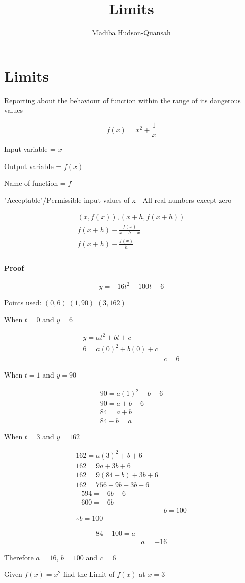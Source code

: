 \documentclass[12pt letter]{article}
\title{Limits}
\author{Madiba Hudson-Quansah}
\begin{document}
\part{Limits}
Reporting about the behaviour of function within the range of its dangerous values

\begin{displaymath}
	f(x) = x^2 + \frac{1}{x}
\end{displaymath}

Input variable = $x$

Output variable = $f(x)$

Name of function = $f$


"Acceptable"/Permissible input values of x - All real numbers except zero

\begin{gather*}
	(x, f(x)), (x+h, f(x+h))      \\
	f(x+h) - \frac{f(x)}{x+h-x} \\
	f(x+h) - \frac{f(x)}{h}         \\
\end{gather*}

\subsection{Proof}

\[y = -16t^2+100t+6\]

Points used:
$(0, 6) \; (1, 90) \; (3,162)$

When $t = 0$ and $y = 6$

\begin{align*}
	y = at^2 + bt+c      \\
	6 = a(0)^2 + b(0) +c \\
	 & c = 6
\end{align*}

When $t=1$ and $y=90$

\begin{align*}
	90 = a(1)^2 +b +6 \\
	90 = a + b + 6    \\
	84 = a + b        \\
	84 - b = a
\end{align*}

When $t=3$ and $y=162$

\begin{align*}
	162 = a(3)^2 + b + 6     \\
	162 = 9a + 3b + 6        \\
	162 = 9(84 - b) + 3b + 6 \\
	162 = 756 - 9b +3b +6    \\
	-594 = -6b +6            \\
	-600 = -6b               \\
	 & b = 100               \\[20pt]
	\therefore b = 100
\end{align*}

\begin{align*}
	84 - 100 = a \\
	 & a = -16
\end{align*}

Therefore $a=16$, $b=100$ and $c=6$
\pagebreak

\large{Given $f(x) = x^2$ find the Limit of $f(x)$ at $x=3$}
\end{document}
